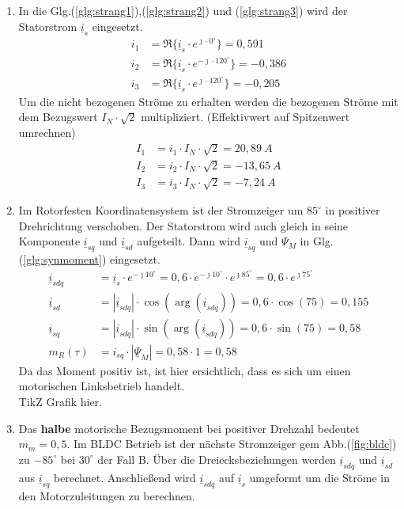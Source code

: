 \begin{solution}
\begin{enumerate}
\item In die Glg.(\ref{glg:strang1}),(\ref{glg:strang2}) und (\ref{glg:strang3}) wird der Statorstrom $\underline{i}_s$ eingesetzt.
\begin{align}
i_1 & = \Re \{ \underline{i}_s \cdot e^{\jmath \cdot 0 ^\circ} \} = 0,591\\
i_2 & = \Re \{ \underline{i}_s \cdot e^{-\jmath \cdot 120 ^\circ} \} = -0,386 \\
i_3 & = \Re \{ \underline{i}_s \cdot e^{\jmath \cdot 120 ^\circ} \}=  -0,205
\end{align}
Um die nicht bezogenen Ströme zu erhalten werden die bezogenen Ströme mit dem Bezugswert $I_N \cdot \sqrt{2}$ multipliziert. (Effektivwert auf Spitzenwert umrechnen)
\begin{align}
I_1 & = i_1 \cdot I_N \cdot \sqrt{2}  =20,89~A \\
I_2 & = i_2 \cdot I_N \cdot \sqrt{2} =-13,65~A \\
I_3 & = i_3 \cdot I_N \cdot \sqrt{2} =-7,24~A
\end{align}
\item Im Rotorfesten Koordinatensystem ist der Stromzeiger um $85^\circ$ in positiver Drehrichtung verschoben. Der Statorstrom wird auch gleich in seine Komponente $\underline{i}_{sq}$ und $\underline{i}_{sd}$ aufgeteilt. Dann wird $\underline{i}_{sq}$ und $\Psi_M$ in Glg.(\ref{glg:synmoment}) eingesetzt.
\begin{align}
\underline{i}_{sdq} & = \underline{i}_s \cdot e^{-\jmath 10 ^\circ} = 0,6 \cdot e^{-\jmath 10 ^\circ} \cdot e^{\jmath 85 ^\circ} = 0,6 \cdot e^{\jmath 75 ^\circ} \\
\underline{i}_{sd} & = |\underline{i}_{sdq}| \cdot \cos(\arg(\underline{i}_{sdq})) = 0,6 \cdot \cos(75) = 0,155 \\
\underline{i}_{sq} & = |\underline{i}_{sdq}| \cdot \sin(\arg(\underline{i}_{sdq})) = 0,6 \cdot \sin(75) = 0,58 \\
m_R(\tau)& =  i_{sq} \cdot | \underline{\Psi}_M|= 0,58\cdot 1 = 0,58
\end{align}
Da das Moment positiv ist, ist hier ersichtlich, dass es sich um einen motorischen Linksbetrieb handelt.\\
TikZ Grafik hier.
\item Das \textbf{halbe} motorische Bezugsmoment bei positiver Drehzahl bedeutet $m_m = 0,5$. Im BLDC Betrieb ist der nächste Stromzeiger gem Abb.(\ref{fig:bldc}) zu $-85^\circ$ bei $30^\circ$ der Fall B. Über die Dreiecksbeziehungen werden $\underline{i}_{sdq}$ und $\underline{i}_{sd}$ aus $\underline{i}_{sq}$ berechnet. Anschließend wird $\underline{i}_{sdq}$ auf $\underline{i}_{s}$ umgeformt um die Ströme in den Motorzuleitungen zu berechnen.

\end{enumerate}
\end{solution}
